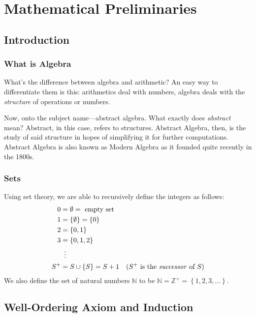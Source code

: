 \chapter{Mathematical Preliminaries}

\section{Introduction}

\subsection{What is Algebra}

What's the difference between algebra and arithmetic? An easy way to differentiate them is this: arithmetics deal with numbers, algebra deals with the \textit{structure} of operations or numbers.

Now, onto the subject name---abstract algebra. What exactly does \textit{abstract} mean? Abstract, in this case, refers to structures. Abstract Algebra, then, is the study of said structure in hopes of simplifying it for further computations. Abstract Algebra is also known as Modern Algebra as it founded quite recently in the 1800s.

\subsection{Sets}

Using set theory, we are able to recursively define the integers as follows:
\[
\begin{aligned}
    0 &= \emptyset = \text{ empty set} \\
    1 &= \left\{\emptyset\right\} = \left\{0\right\} \\
    2 &= \left\{0, 1\right\} \\
    3 &= \left\{0, 1, 2\right\} \\
      &\phantom{0}\vdots \\
    S^+ &= S \cup \left\{S\right\} = S+1 &\text{(\(S^+\) is the \textit{successor} of \(S\))}
\end{aligned}
\]
We also define the set of natural numbers \(\mathbb{N}\) to be \( \mathbb{N} = \mathbb{Z}^+ = \left\{1, 2, 3, \ldots\right\}\).

\section{Well-Ordering Axiom and Induction}

